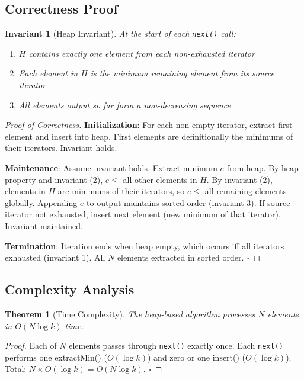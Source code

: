 \documentclass[11pt]{article}
\newtheorem{theorem}{Theorem}
\newtheorem{invariant}{Invariant}
\begin{document}
\subsection{Correctness Proof}

\begin{invariant}[Heap Invariant]
At the start of each \texttt{next()} call:
\begin{enumerate}
    \item $H$ contains exactly one element from each non-exhausted iterator
    \item Each element in $H$ is the minimum remaining element from its source iterator
    \item All elements output so far form a non-decreasing sequence
\end{enumerate}
\end{invariant}

\begin{proof}[Proof of Correctness]
\textbf{Initialization}: For each non-empty iterator, extract first element and insert into heap. First elements are definitionally the minimums of their iterators. Invariant holds.

\textbf{Maintenance}: Assume invariant holds. Extract minimum $e$ from heap. By heap property and invariant (2), $e \leq$ all other elements in $H$. By invariant (2), elements in $H$ are minimums of their iterators, so $e \leq$ all remaining elements globally. Appending $e$ to output maintains sorted order (invariant 3). If source iterator not exhausted, insert next element (new minimum of that iterator). Invariant maintained.

\textbf{Termination}: Iteration ends when heap empty, which occurs iff all iterators exhausted (invariant 1). All $N$ elements extracted in sorted order. $\square$
\end{proof}

\subsection{Complexity Analysis}

\begin{theorem}[Time Complexity]
The heap-based algorithm processes $N$ elements in $O(N \log k)$ time.
\end{theorem}

\begin{proof}
Each of $N$ elements passes through \texttt{next()} exactly once. Each \texttt{next()} performs one extractMin() ($O(\log k)$) and zero or one insert() ($O(\log k)$). Total: $N \times O(\log k) = O(N \log k)$. $\square$
\end{proof}
\end{document}
